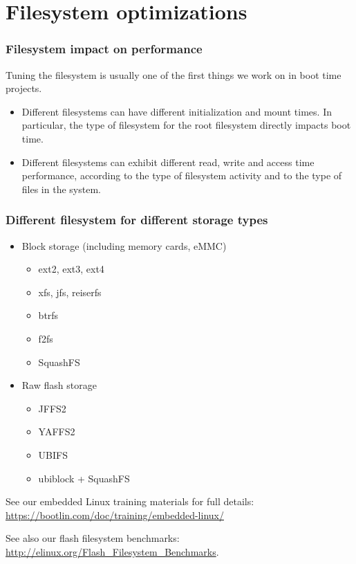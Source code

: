 \section{Filesystem optimizations}

\begin{frame}
\frametitle{Filesystem impact on performance}
Tuning the filesystem is usually one of the first things
we work on in boot time projects.
\begin{itemize}
\item Different filesystems can have different initialization
      and mount times. In particular, the type of filesystem
      for the root filesystem directly impacts boot time.
\item Different filesystems can exhibit different read, write
      and access time performance, according to the type
      of filesystem activity and to the type of files in the
      system.
\end{itemize}
\end{frame}

\begin{frame}
\frametitle{Different filesystem for different storage types}
\begin{itemize}
\item Block storage (including memory cards, eMMC)
      \begin{itemize}
      \item ext2, ext3, ext4
      \item xfs, jfs, reiserfs
      \item btrfs
      \item f2fs
      \item SquashFS
      \end{itemize}
\item Raw flash storage
      \begin{itemize}
      \item JFFS2
      \item YAFFS2
      \item UBIFS
      \item ubiblock + SquashFS
      \end{itemize}
\end{itemize}
See our embedded Linux training materials for full details:
{\small
\url{https://bootlin.com/doc/training/embedded-linux/}
}

See also our flash filesystem benchmarks:
{\small
\url{http://elinux.org/Flash_Filesystem_Benchmarks}.
}
\end{frame}

